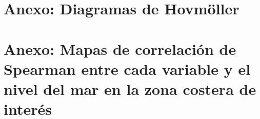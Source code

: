 \begin{appendix}
\chapter{Anexo: Diagramas de Hovmöller}\label{AnexoA}


\chapter{Anexo: Mapas de correlación de Spearman entre cada variable y el nivel del mar en la zona costera de interés}\label{AnexoB}


\end{appendix}